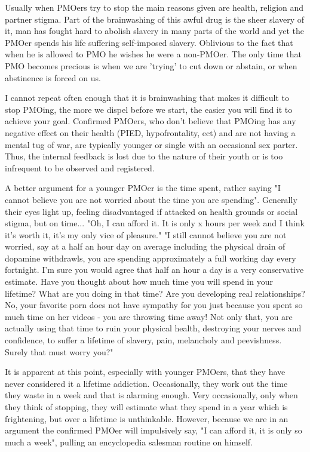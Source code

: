\documentclass[easypeasy.tex]{subfiles}
\begin{document}
Usually when PMOers try to stop the main reasons given are health, religion and partner stigma. Part of the brainwashing of this awful drug is the sheer slavery of it, man has fought hard to abolish slavery in many parts of the world and yet the PMOer spends his life suffering self-imposed slavery. Oblivious to the fact that when he is allowed to PMO he wishes he were a non-PMOer. The only time that PMO becomes precious is when we are 'trying' to cut down or abstain, or when abstinence is forced on us.

I cannot repeat often enough that it is brainwashing that makes it difficult to stop PMOing, the more we dispel before we start, the easier you will find it to achieve your goal. Confirmed PMOers, who don't believe that PMOing has any negative effect on their health (PIED, hypofrontality, ect) and are not having a mental tug of war, are typically younger or single with an occasional sex parter. Thus, the internal feedback is lost due to the nature of their youth or is too infrequent to be observed and registered.

A better argument for a younger PMOer is the time spent, rather saying "I cannot believe you are not worried about the time you are spending". Generally their eyes light up, feeling disadvantaged if attacked on health grounds or social stigma, but on time...
  "Oh, I can afford it. It is only x hours per week and I think it's worth it, it's my only vice of pleasure."
  "I still cannot believe you are not worried, say at a half an hour day on average including the physical drain of dopamine withdrawls, you are spending approximately a full working day every fortnight. I'm sure you would agree that half an hour a day is a very conservative estimate. Have you thought about how much time you will spend in your lifetime? What are you doing in that time? Are you developing real relationships? No, your favorite porn does not have sympathy for you just because you spent so much time on her videos - you are throwing time away! Not only that, you are actually using that time to ruin your physical health, destroying your nerves and confidence, to suffer a lifetime of slavery, pain, melancholy and peevishness. Surely that must worry you?"

It is apparent at this point, especially with younger PMOers, that they have never considered it a lifetime addiction. Occasionally, they work out the time they waste in a week and that is alarming enough. Very occasionally, only when they think of stopping, they will estimate what they spend in a year which is frightening, but over a lifetime is unthinkable. However, because we are in an argument the confirmed PMOer will impulsively say, "I can afford it, it is only so much a week", pulling an encyclopedia salesman routine on himself.
\end{document}
